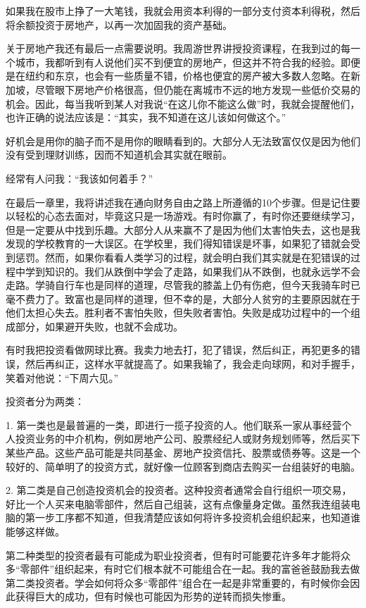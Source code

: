 如果我在股市上挣了一大笔钱，我就会用资本利得的一部分支付资本利得税，然后将余额投资于房地产，以再一次加固我的资产基础。

关于房地产我还有最后一点需要说明。我周游世界讲授投资课程，在我到过的每一个城市，我都听到有人说他们买不到便宜的房地产，但这并不符合我的经验。即便是在纽约和东京，也会有一些质量不错，价格也便宜的房产被大多数人忽略。在新加坡，尽管眼下房地产价格很高，但仍能在离城市不远的地方发现一些低价交易的机会。因此，每当我听到某人对我说“在这儿你不能这么做”时，我就会提醒他们，也许正确的说法应该是：“其实，我不知道在这儿该如何做这个。”

好机会是用你的脑子而不是用你的眼睛看到的。大部分人无法致富仅仅是因为他们没有受到理财训练，因而不知道机会其实就在眼前。

经常有人问我：“我该如何着手？”

在最后一章里，我将讲述我在通向财务自由之路上所遵循的10个步骤。但是记住要以轻松的心态去面对，毕竟这只是一场游戏。有时你赢了，有时你还要继续学习，但是一定要从中找到乐趣。大部分人从来赢不了是因为他们太害怕失去，这也是我发现的学校教育的一大误区。在学校里，我们得知错误是坏事，如果犯了错就会受到惩罚。然而，如果你看看人类学习的过程，就会明白我们其实就是在犯错误的过程中学到知识的。我们从跌倒中学会了走路，如果我们从不跌倒，也就永远学不会走路。学骑自行车也是同样的道理，尽管我的膝盖上仍有伤疤，但今天我骑车时已毫不费力了。致富也是同样的道理，但不幸的是，大部分人贫穷的主要原因就在于他们太担心失去。胜利者不害怕失败，但失败者害怕。失败是成功过程中的一个组成部分，如果避开失败，也就不会成功。

有时我把投资看做网球比赛。我卖力地去打，犯了错误，然后纠正，再犯更多的错误，然后再纠正，这样水平就提高了。如果我输了，我会走向球网，和对手握手，笑着对他说：“下周六见。”

投资者分为两类：

1. 第一类也是最普遍的一类，即进行一揽子投资的人。他们联系一家从事经营个人投资业务的中介机构，例如房地产公司、股票经纪人或财务规划师等，然后买下某些产品。这些产品可能是共同基金、房地产投资信托、股票或债券等。这是一个较好的、简单明了的投资方式，就好像一位顾客到商店去购买一台组装好的电脑。

2. 第二类是自己创造投资机会的投资者。这种投资者通常会自行组织一项交易，好比一个人买来电脑零部件，然后自己组装，这有点像量身定做。虽然我连组装电脑的第一步工序都不知道，但我清楚应该如何将许多投资机会组织起来，也知道谁能够这样做。

第二种类型的投资者最有可能成为职业投资者，但有时可能要花许多年才能将众多“零部件”组织起来，有时它们根本就不可能组合在一起。我的富爸爸鼓励我去做第二类投资者。学会如何将众多“零部件”组合在一起是非常重要的，有时候你会因此获得巨大的成功，但有时候也可能因为形势的逆转而损失惨重。

